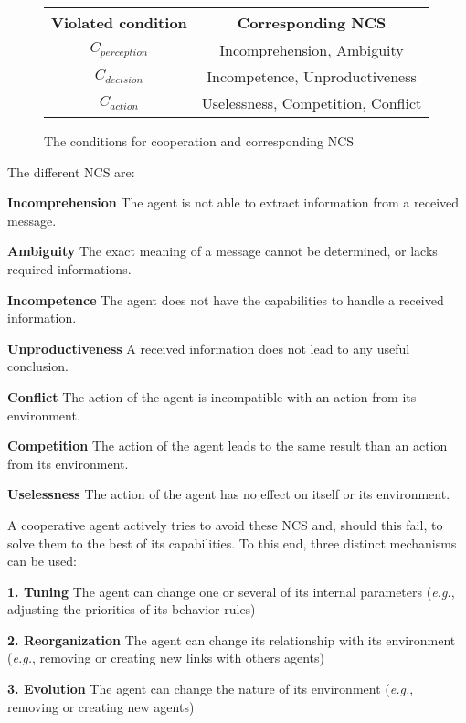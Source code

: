 \begin{figure}
\centering
\begin{tabular}{|c|c|}
\hline
\textbf{Violated condition}	& \textbf{Corresponding NCS} \\
\hline
$C_{perception}$     & Incomprehension, Ambiguity\\
\hline
$C_{decision}$      & Incompetence, Unproductiveness \\
\hline
$C_{action}$     & Uselessness, Competition, Conflict\\
\hline
\end{tabular}
\caption{The conditions for cooperation and corresponding NCS}
\label{NCS}
\end{figure}

The different NCS are:
\begin{compactitem}
\item\textbf{Incomprehension} The agent is not able to extract information from a received message.
\item\textbf{Ambiguity} The exact meaning of a message cannot be determined, or lacks required informations.
\item\textbf{Incompetence} The agent does not have the capabilities to handle a received information.
\item\textbf{Unproductiveness} A received information does not lead to any useful conclusion.
\item\textbf{Conflict} The action of the agent is incompatible with an action from its environment.
\item\textbf{Competition} The action of the agent leads to the same result than an action from its environment.
\item\textbf{Uselessness} The action of the agent has no effect on itself or its environment.
\end{compactitem}

A cooperative agent actively tries to avoid these NCS and, should this fail, to solve them to the best of its capabilities. To this end, three distinct mechanisms can be used\cite{bonjean2009engineering}:

\begin{compactitem}
\item\textbf{1. Tuning} The agent can change one or several of its internal parameters (\textit{e.g.}, adjusting the priorities of its behavior rules)
\item\textbf{2. Reorganization} The agent can change its relationship with its environment (\textit{e.g.}, removing or creating new links with others agents)
\item\textbf{3. Evolution} The agent can change the nature of its environment (\textit{e.g.}, removing or creating new agents)
\end{compactitem}

